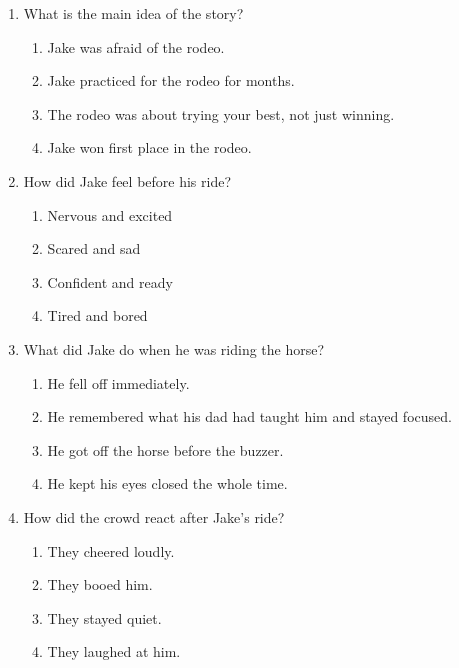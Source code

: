 \documentclass[12pt]{article}
\begin{document}
\begin{enumerate}

    \item What is the main idea of the story?

    \begin{enumerate}[label=\Alph*.]
        \item Jake was afraid of the rodeo.
        \item Jake practiced for the rodeo for months.
        \item The rodeo was about trying your best, not just winning.
        \item Jake won first place in the rodeo.
    \end{enumerate}

    \vspace{0.5cm}

    \item How did Jake feel before his ride?

    \begin{enumerate}[label=\Alph*.]
        \item Nervous and excited
        \item Scared and sad
        \item Confident and ready
        \item Tired and bored
    \end{enumerate}

    \vspace{0.5cm}

    \item What did Jake do when he was riding the horse?

    \begin{enumerate}[label=\Alph*.]
        \item He fell off immediately.
        \item He remembered what his dad had taught him and stayed focused.
        \item He got off the horse before the buzzer.
        \item He kept his eyes closed the whole time.
    \end{enumerate}

    \vspace{0.5cm}

    \item How did the crowd react after Jake's ride?

    \begin{enumerate}[label=\Alph*.]
        \item They cheered loudly.
        \item They booed him.
        \item They stayed quiet.
        \item They laughed at him.
    \end{enumerate}


\end{enumerate}
\end{document}
